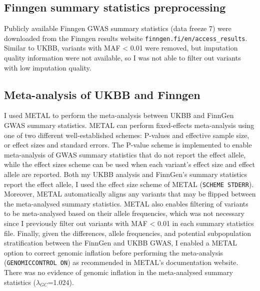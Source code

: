 \subsection{Finngen summary statistics preprocessing}
Publicly available Finngen GWAS summary statistics (data freeze 7) were downloaded from the Finngen results website \Verb+finngen.fi/en/access_results+. Similar to UKBB, variants with MAF < 0.01 were removed, but imputation quality information were not available, so I was not able to filter out variants with low imputation quality. 

\subsection{Meta-analysis of UKBB and Finngen}
I used METAL to perform the meta-analysis between UKBB and FinnGen GWAS summary statistics.  METAL can perform fixed-effects meta-analysis using one of two different well-established schemes: P-values and effective sample size, or effect sizes and standard errors. The P-value scheme is implemented to enable meta-analysis of GWAS summary statistics that do not report the effect allele, while the effect sizes scheme can be used when each variant's effect size and effect allele are reported. Both my UKBB analysis and FinnGen's summary statistics report the effect allele, I used the effect size scheme of METAL (\Verb+SCHEME STDERR+). \\

Moreover, METAL automatically aligns any variants that may be flipped between the meta-analysed summary statistics. METAL also enables filtering of variants to be meta-analysed based on their allele frequencies, which was not necessary since I previously filter out variants with MAF < 0.01 in each summary statistics file. Finally, given the differences, allele frequencies, and potential subpopulation stratification between the FinnGen and UKBB GWAS, I enabled a METAL option to correct genomic inflation before performing the meta-analysis (\Verb+GENOMICCONTROL ON+) as recommended in METAL's documentation website. There was no evidence of genomic inflation in the meta-analysed summary statistics ($\lambda_{GC}$=1.024).\\

